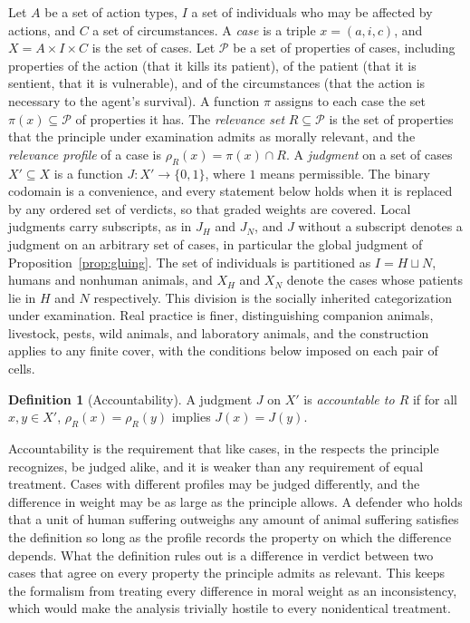 \documentclass[11pt]{article}
\theoremstyle{definition}
\newtheorem{definition}{Definition}[section]
\theoremstyle{plain}
\theoremstyle{definition}
\newcommand{\Judg}{J}
\newcommand{\prof}{\rho}
\newcommand{\Rel}{R}
\newcommand{\Prop}{\mathcal{P}}
\begin{document}
Let $A$ be a set of action types, $I$ a set of individuals who may be affected by actions, and $C$ a set of circumstances. A \emph{case} is a triple $x=(a,i,c)$, and $X=A\times I\times C$ is the set of cases. Let $\Prop$ be a set of properties of cases, including properties of the action (that it kills its patient), of the patient (that it is sentient, that it is vulnerable), and of the circumstances (that the action is necessary to the agent's survival). A function $\pi$ assigns to each case the set $\pi(x)\subseteq\Prop$ of properties it has. The \emph{relevance set} $\Rel\subseteq\Prop$ is the set of properties that the principle under examination admits as morally relevant, and the \emph{relevance profile} of a case is $\prof_{\Rel}(x)=\pi(x)\cap\Rel$. A \emph{judgment} on a set of cases $X'\subseteq X$ is a function $\Judg:X'\to\{0,1\}$, where $1$ means permissible. The binary codomain is a convenience, and every statement below holds when it is replaced by any ordered set of verdicts, so that graded weights are covered. Local judgments carry subscripts, as in $\Judg_H$ and $\Judg_N$, and $\Judg$ without a subscript denotes a judgment on an arbitrary set of cases, in particular the global judgment of Proposition~\ref{prop:gluing}. The set of individuals is partitioned as $I=H\sqcup N$, humans and nonhuman animals, and $X_H$ and $X_N$ denote the cases whose patients lie in $H$ and $N$ respectively. This division is the socially inherited categorization under examination. Real practice is finer, distinguishing companion animals, livestock, pests, wild animals, and laboratory animals, and the construction applies to any finite cover, with the conditions below imposed on each pair of cells.

\begin{definition}[Accountability]
A judgment $\Judg$ on $X'$ is \emph{accountable to $\Rel$} if for all $x,y\in X'$, $\prof_{\Rel}(x)=\prof_{\Rel}(y)$ implies $\Judg(x)=\Judg(y)$.
\end{definition}

Accountability is the requirement that like cases, in the respects the principle recognizes, be judged alike, and it is weaker than any requirement of equal treatment. Cases with different profiles may be judged differently, and the difference in weight may be as large as the principle allows. A defender who holds that a unit of human suffering outweighs any amount of animal suffering satisfies the definition so long as the profile records the property on which the difference depends. What the definition rules out is a difference in verdict between two cases that agree on every property the principle admits as relevant. This keeps the formalism from treating every difference in moral weight as an inconsistency, which would make the analysis trivially hostile to every nonidentical treatment.
\end{document}
